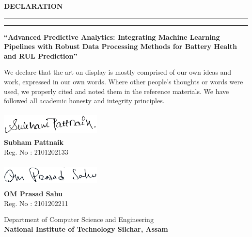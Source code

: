 \newpage
\thispagestyle{empty}

\begin{center}
\textbf{\LARGE{DECLARATION}}
\vspace{.1in}\hrule
\vspace{.05in}\hrule
\vspace{.4in}

\normalsize 
\textbf{``Advanced Predictive Analytics: Integrating Machine Learning Pipelines with Robust Data Processing Methods for Battery Health and RUL Prediction''}\\
\vspace{.6in}

We declare that the art on display is mostly comprised of our own ideas and work, expressed in our own words. Where other people's thoughts or words were used, we properly cited and noted them in the reference materials. We have followed all academic honesty and integrity principles.
\vspace{1in}

\begin{flushright}
\begin{minipage}{2in}
    \begin{center}
    
        \includegraphics[width=2in, height=0.5in]{signatureS.png}
        \\
        \textbf{Subham Pattnaik} \\
        Reg. No : 2101202133 \\
        
        \vspace{0.5in}
        
        \includegraphics[width=2in, height=0.5in]{signature.png}
        \\
        \textbf{OM Prasad Sahu} \\
        Reg. No : 2101202211 \\
        
    \end{center}
\end{minipage}
\end{flushright}

\vspace{1.5in}
Department of Computer Science and Engineering\\
\textbf{National Institute of Technology Silchar, Assam}
\end{center}
